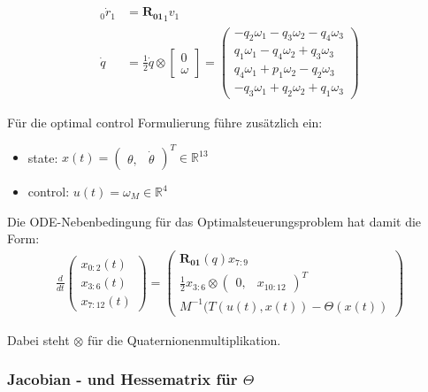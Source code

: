 \documentclass[12pt, a4paper]{scrartcl}
\newcommand{\R}{\mathbb{R}}
\begin{document}
\begin{align*}
	_{0}\dot{r}_{1} &= \mathbf{R_{01}} _{1}v_{1} \\
	\dot{q} &= \frac{1}{2} \dot q \otimes \begin{bmatrix} 0 \\ \omega \end{bmatrix} 
					= \begin{pmatrix}	-q_2\omega_1 -q_3\omega_2 -q_4\omega_3 \\
														q_1\omega_1 -q_4\omega_2 +q_3\omega_3 \\
														q_4\omega_1 +p_1\omega_2 -q_2\omega_3 \\
														-q_3\omega_1 +q_2\omega_2 +q_1\omega_3
						\end{pmatrix}
\end{align*}

Für die optimal control Formulierung führe zusätzlich ein:
\begin{itemize}
	\item state: $x(t) =\left(\begin{matrix} \theta, &\dot \theta \end{matrix}\right)^T \in \R^{13}$
	\item control: $u(t) = \omega_{M} \in \R^{4}$
\end{itemize}

Die ODE-Nebenbedingung für das Optimalsteuerungsproblem hat damit die Form:
\begin{align}
\frac{d}{dt} 
  \left(
      \begin{matrix}
          x_{0:2}(t) \\
          x_{3:6}(t) \\
          x_{7:12}(t)  
      \end{matrix}
  \right)
  = 
  \left(
      \begin{matrix}
          \mathbf{R_{01}}(q)x_{7:9} \\
          \frac{1}{2} x_{3:6} \otimes \left(\begin{matrix} 0, & x_{10:12} \end{matrix}\right)^T\\
          M^{-1} (T(u(t), x(t)) - \Theta(x(t))
      \end{matrix}
  \right)
\end{align}

Dabei steht $ \otimes $ für die Quaternionenmultiplikation. 

\subsubsection{Jacobian - und Hessematrix für $\Theta$}
\end{document}
